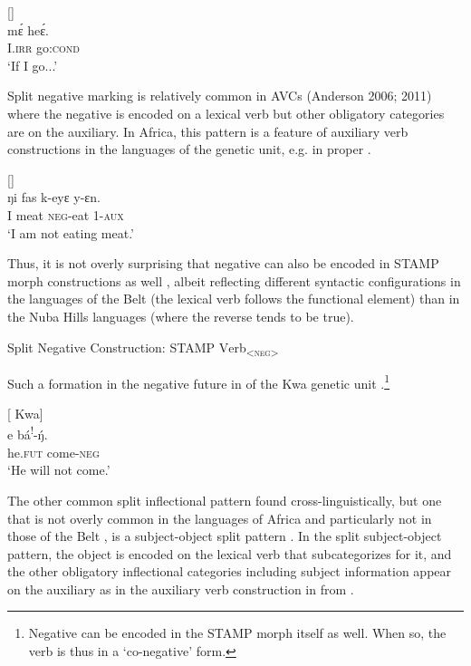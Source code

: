 \documentclass[output=paper]{langsci/langscibook}
\begin{document}
\ea\label{ex:anderson:25}
   \citep[96-98; 105]{BendorSamuelEtAl1973}    []\\
 \gll m\'{ɛ}    he\'{ɛ}.   \\
I.\textsc{irr}  go:\textsc{cond}  \\
\glt `If I go...'  
\z

Split negative marking is relatively common in AVCs (Anderson 2006; 2011) where the negative is encoded on a lexical verb but other obligatory categories are on the auxiliary. In Africa, this pattern is a feature of auxiliary verb constructions in the languages of the  genetic unit, e.g. in  proper .

\ea\label{ex:anderson:26}
 \citep[297]{TuckerBryan1966}      []\\
\gll ŋi   fas    k-eyɛ    y-ɛn.\\
I  meat    \textsc{neg}-eat  1-\textsc{aux}\\
\glt `I am not eating meat.'
\z

Thus, it is not overly surprising that negative can also be encoded in STAMP morph constructions as well , albeit reflecting different syntactic configurations in the languages of the  Belt (the lexical verb follows the functional element) than in the Nuba Hills languages (where the reverse tends to be true).

\ea\label{ex:anderson:27}
Split Negative Construction:  \textsc{STAMP  V}erb\textsc{\textsubscript{<neg>}}
\z

Such a formation in the negative future in  of the  Kwa genetic unit .\footnote{Negative can be encoded in the STAMP morph itself as well. When so, the verb is thus in a `co-negative' form.}

\ea\label{ex:anderson:28}
 \citep[105]{Kropp1988}        [ Kwa]\\
\gll e\textsuperscript{{\textbar}}    bá\textsuperscript{!}-\'{ŋ}.\\
he\textsc{.fut}  come-\textsc{neg}\\
\glt `He will not come.'
\z

The other common split inflectional pattern found cross-linguistically, but one that is not overly common in the languages of Africa and particularly not in those of the  Belt \citep{Anderson2011}, is a subject-object split pattern \citep{Anderson2006}. In the split subject-object pattern, the object is encoded on the lexical verb that subcategorizes for it, and the other obligatory inflectional categories including subject information appear on the auxiliary as in the auxiliary verb construction in  from .
\end{document}
